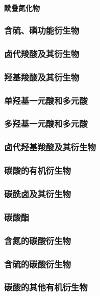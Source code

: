 \documentclass[UTF8]{../03-Chemistry}
\begin{document}
            \paragraph{酰叠氮化物}
        \subsubsection{含硫、磷功能衍生物}
    \subsubsection{卤代羧酸及其衍生物}
    \subsubsection{羟基羧酸及其衍生物}
        \subsubsection{单羟基一元酸和多元酸}
        \subsubsection{多羟基一元酸和多元酸}
        \subsubsection{卤代羟基羧酸及其衍生物}
    \subsubsection{碳酸的有机衍生物}
        \subsubsection{碳酰卤及其衍生物}
        \subsubsection{碳酸酯}
        \subsubsection{含氮的碳酸衍生物}
        \subsubsection{含硫的碳酸衍生物}
        \subsubsection{碳酸的其他有机衍生物}
\end{document}
